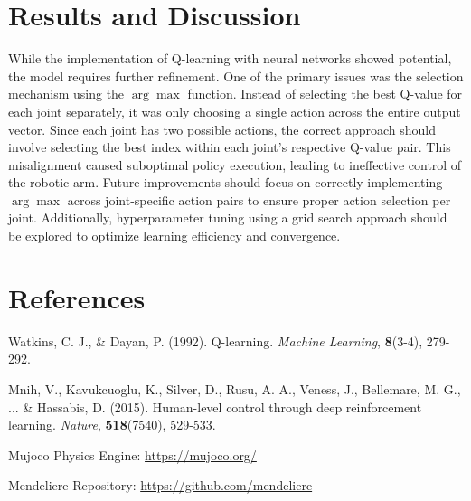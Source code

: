 \documentclass{article}
\begin{document}
\section{Results and Discussion}
While the implementation of Q-learning with neural networks showed potential, the model requires further refinement. One of the primary issues was the selection mechanism using the $\arg\max$ function. Instead of selecting the best Q-value for each joint separately, it was only choosing a single action across the entire output vector. Since each joint has two possible actions, the correct approach should involve selecting the best index within each joint's respective Q-value pair. This misalignment caused suboptimal policy execution, leading to ineffective control of the robotic arm. Future improvements should focus on correctly implementing $\arg\max$ across joint-specific action pairs to ensure proper action selection per joint.
Additionally, hyperparameter tuning using a grid search approach should be explored to optimize learning efficiency and convergence.

\section{References}
Watkins, C. J., \& Dayan, P. (1992). Q-learning. \textit{Machine Learning}, \textbf{8}(3-4), 279-292. 

Mnih, V., Kavukcuoglu, K., Silver, D., Rusu, A. A., Veness, J., Bellemare, M. G., ... \& Hassabis, D. (2015). Human-level control through deep reinforcement learning. \textit{Nature}, \textbf{518}(7540), 529-533.

Mujoco Physics Engine: \url{https://mujoco.org/}

Mendeliere Repository: \url{https://github.com/mendeliere}
\end{document}
